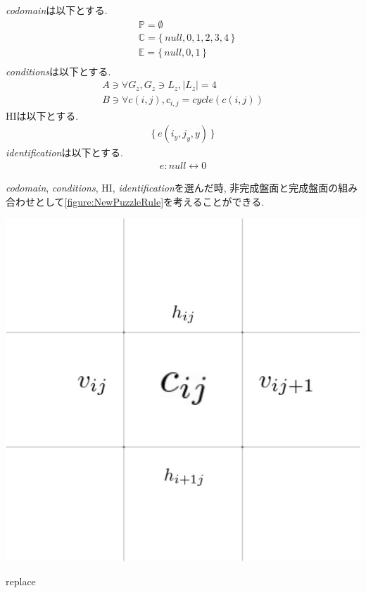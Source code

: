 \textit{codomain}は以下とする.
\begin{align}
   & \mathbb{P}=\emptyset                       \\
   & \mathbb{C}=\{\,\textit{null},0,1,2,3,4\,\} \\
   & \mathbb{E}=\{\,\textit{null},0,1\,\}       \\
\end{align}
\textit{conditions}は以下とする.
\begin{align}
  A\ni \forall G_z, G_z\ni L_z, |L_z|=4 \\
  B\ni \forall c(i,j), c_{i,j}= cycle(c(i,j))
\end{align}
HIは以下とする.
\begin{align}
  \{\,e(i_y,j_y,y)\,\}
\end{align}
\textit{identification}は以下とする.
\begin{align}
  e:\textit{null}\leftrightarrow 0
\end{align}

\textit{codomain}, \textit{conditions}, HI, \textit{identification}を選んだ時, 非完成盤面と完成盤面の組み合わせとして\cref{figure:NewPuzzleRule}を考えることができる.
\begin{clearpagefigure}
  \includegraphics[width=0.8\linewidth,clip]{fig/cycle.png}
  \caption{replace}
  \label{figure:NewPuzzleRule}
\end{clearpagefigure}
